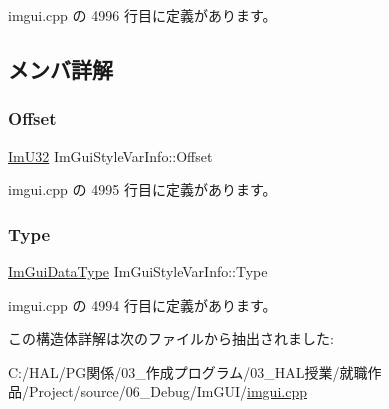  imgui.\+cpp の 4996 行目に定義があります。



\subsection{メンバ詳解}
\mbox{\label{struct_im_gui_style_var_info_ae900d6a02166d3d0433c18b95aec10e8}} 
\subsubsection{\texorpdfstring{Offset}{Offset}}
{\footnotesize\ttfamily \mbox{\hyperlink{imgui_8h_a118cff4eeb8d00e7d07ce3d6460eed36}{Im\+U32}} Im\+Gui\+Style\+Var\+Info\+::\+Offset}



 imgui.\+cpp の 4995 行目に定義があります。

\mbox{\label{struct_im_gui_style_var_info_a62f42d2bb7b71b7530493e16e622cb81}} 
\subsubsection{\texorpdfstring{Type}{Type}}
{\footnotesize\ttfamily \mbox{\hyperlink{imgui__internal_8h_a22f27475affc8d8a1f2407887e5e1d19}{Im\+Gui\+Data\+Type}} Im\+Gui\+Style\+Var\+Info\+::\+Type}



 imgui.\+cpp の 4994 行目に定義があります。



この構造体詳解は次のファイルから抽出されました\+:\begin{DoxyCompactItemize}
\item 
C\+:/\+H\+A\+L/\+P\+G関係/03\+\_\+作成プログラム/03\+\_\+\+H\+A\+L授業/就職作品/\+Project/source/06\+\_\+\+Debug/\+Im\+G\+U\+I/\mbox{\hyperlink{imgui_8cpp}{imgui.\+cpp}}\end{DoxyCompactItemize}

